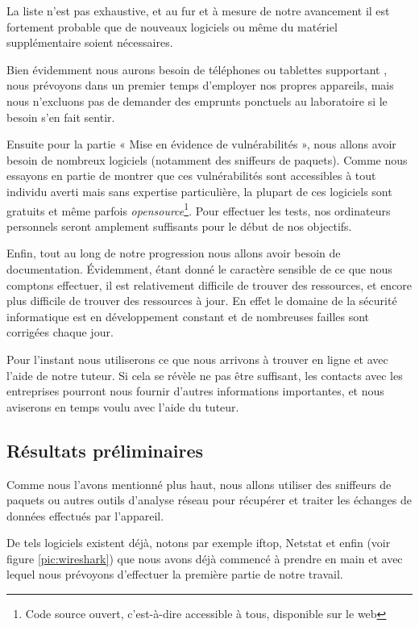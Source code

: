 \documentclass[a4paper, 12pt,twoside]{article}
\begin{document}
		La liste n'est pas exhaustive, et au fur et à mesure de notre avancement il est fortement probable que de nouveaux logiciels ou même du matériel supplémentaire soient nécessaires.
		
		Bien évidemment nous aurons besoin de téléphones ou tablettes supportant \Android{}, nous prévoyons dans un premier temps d'employer nos propres appareils, mais nous n'excluons pas de demander des emprunts ponctuels au laboratoire si le besoin s'en fait sentir.
		
		Ensuite pour la partie «  Mise en évidence de vulnérabilités  », nous allons avoir besoin de nombreux logiciels (notamment des sniffeurs de paquets). Comme nous essayons en partie de montrer que ces vulnérabilités sont accessibles à tout individu averti mais sans expertise particulière, la plupart de ces logiciels sont gratuits et même parfois \emph{opensource}\footnote{Code source ouvert,  c'est-à-dire accessible à tous, disponible sur le web}. Pour effectuer les tests, nos ordinateurs personnels seront amplement suffisants pour le début de nos objectifs.
		
		Enfin, tout au long de notre progression nous allons avoir besoin de documentation. Évidemment, étant donné le caractère sensible de ce que nous comptons effectuer, il est relativement difficile de trouver des ressources, et encore plus difficile de trouver des ressources à jour. En effet le domaine de la sécurité informatique est en développement constant et de nombreuses failles sont corrigées chaque jour.

		Pour l'instant nous utiliserons ce que nous arrivons à trouver en ligne et avec l'aide de notre tuteur. Si cela se révèle ne pas être suffisant,  les contacts avec les entreprises pourront nous fournir d'autres informations importantes, et nous aviserons en temps voulu avec l'aide du tuteur.

		\subsection{Résultats préliminaires}

		Comme nous l'avons mentionné plus haut, nous allons utiliser des sniffeurs de paquets ou autres outils d'analyse réseau pour récupérer et traiter les échanges de données effectués par l'appareil.
		
		De tels logiciels existent déjà, notons par exemple iftop, Netstat et enfin \wireshark{} (voir figure \ref{pic:wireshark}) que nous avons déjà commencé à prendre en main et avec lequel nous prévoyons d'effectuer la première partie de notre travail.
		
\end{document}
